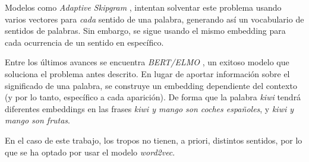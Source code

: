 Modelos como \emph{Adaptive Skipgram} \cite{adaptiveskipgram}, intentan solventar este problema usando
varios vectores para \emph{cada} sentido de una palabra, generando así un vocabulario de sentidos de palabras.
Sin embargo, se sigue usando el mismo embedding para cada ocurrencia de un sentido en específico.

Entre los últimos avances se encuentra \emph{BERT/ELMO} \cite{bert}, un exitoso modelo que soluciona el
problema antes descrito. En lugar de aportar información sobre el significado de una palabra, se construye
un embedding dependiente del contexto (y por lo tanto, específico a cada aparición). De forma que la palabra
\emph{kiwi} tendrá diferentes embeddings en las frases \emph{kiwi y mango son coches españoles}, y
\emph{kiwi y mango son frutas}.

En el caso de este trabajo, los tropos no tienen, a priori, distintos sentidos, por lo que se ha optado
por usar el modelo \emph{word2vec}.
